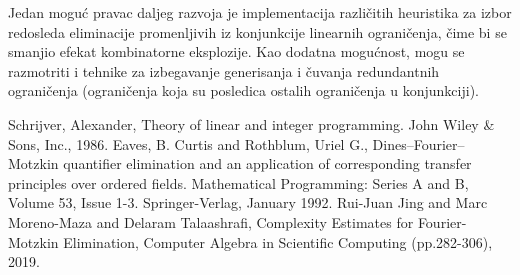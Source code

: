 \documentclass[a4paper,10pt]{article}
\begin{document}
Jedan moguć pravac daljeg razvoja je implementacija različitih heuristika za izbor redosleda eliminacije promenljivih iz konjunkcije linearnih ograničenja, čime bi se smanjio efekat kombinatorne eksplozije. Kao dodatna mogućnost, mogu se razmotriti i tehnike za izbegavanje generisanja i čuvanja redundantnih ograničenja (ograničenja koja su posledica ostalih ograničenja u konjunkciji).

\begin{thebibliography}{100}
 Schrijver, Alexander, Theory of linear and integer programming. John Wiley \& Sons, Inc., 1986.
 Eaves, B. Curtis and Rothblum, Uriel G., Dines--Fourier--Motzkin quantifier elimination and an application of corresponding transfer principles over ordered fields. Mathematical Programming: Series A and B, Volume 53, Issue 1-3. Springer-Verlag, January 1992.
 Rui-Juan Jing and Marc Moreno-Maza and Delaram Talaashrafi, Complexity Estimates for Fourier-Motzkin Elimination, Computer Algebra in Scientific Computing (pp.282-306), 2019.
\end{thebibliography}
\end{document}
